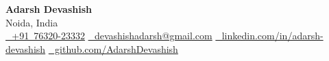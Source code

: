 



\begin{center}
    {\LARGE \textbf{Adarsh Devashish}}\\
    \vspace{0.15cm}
    {\small Noida, India}\\
    \vspace{0.2cm}
    \noindent
    \small
    \href{tel:+917632023332}{\raisebox{-0.2\height}{\Large \faPhoneSquare}\EndAccSupp{}\ \,+91~76320-23332}\hspace{6pt}
    \href{mailto:devashishadarsh@gmail.com}{\raisebox{-0.2\height}{\large \faEnvelopeSquare}\EndAccSupp{}\ \,devashishadarsh@gmail.com}\hspace{6pt}
    \href{https://www.linkedin.com/in/adarsh-devashish/}{\raisebox{-0.2\height}{\large \faLinkedinSquare}\EndAccSupp{}\ \,linkedin.com/in/adarsh-devashish}\hspace{6pt}
    \href{https://github.com/AdarshDevashish}{\raisebox{-0.2\height}{\large \faGithubSquare}\EndAccSupp{}\ \,github.com/AdarshDevashish}

\end{center}

\vspace{-0.2cm}
